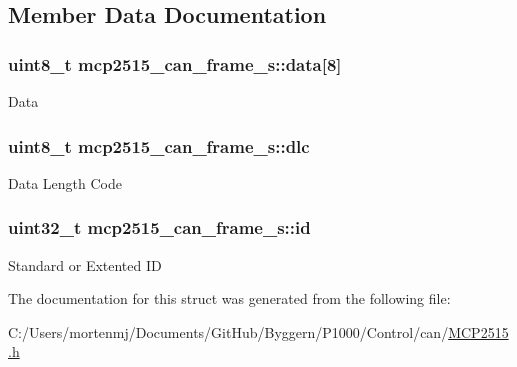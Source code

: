 \subsection{Member Data Documentation}
\hypertarget{structmcp2515__can__frame__s_a438135061fca0fdd743952c80879929f}{
\subsubsection[{data}]{\setlength{\rightskip}{0pt plus 5cm}uint8\-\_\-t mcp2515\-\_\-can\-\_\-frame\-\_\-s\-::data\mbox{[}8\mbox{]}}}\label{structmcp2515__can__frame__s_a438135061fca0fdd743952c80879929f}
Data \hypertarget{structmcp2515__can__frame__s_abee712aaf50a42a28958457427e91831}{
\subsubsection[{dlc}]{\setlength{\rightskip}{0pt plus 5cm}uint8\-\_\-t mcp2515\-\_\-can\-\_\-frame\-\_\-s\-::dlc}}\label{structmcp2515__can__frame__s_abee712aaf50a42a28958457427e91831}
Data Length Code \hypertarget{structmcp2515__can__frame__s_acd4002e0542e51d853b9012578f0216b}{
\subsubsection[{id}]{\setlength{\rightskip}{0pt plus 5cm}uint32\-\_\-t mcp2515\-\_\-can\-\_\-frame\-\_\-s\-::id}}\label{structmcp2515__can__frame__s_acd4002e0542e51d853b9012578f0216b}
Standard or Extented I\-D 

The documentation for this struct was generated from the following file\-:\begin{DoxyCompactItemize}
\item 
C\-:/\-Users/mortenmj/\-Documents/\-Git\-Hub/\-Byggern/\-P1000/\-Control/can/\hyperlink{_m_c_p2515_8h}{M\-C\-P2515.\-h}\end{DoxyCompactItemize}
